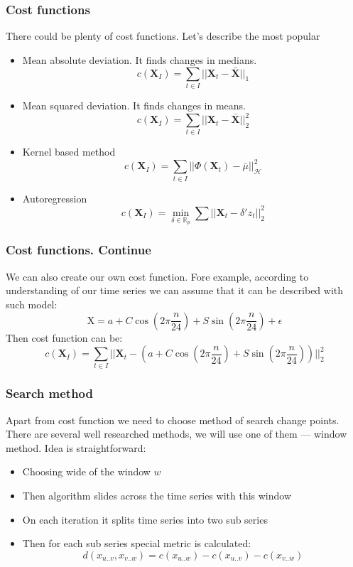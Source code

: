 \documentclass[intlimits, 9pt, unicode]{beamer}
\begin{document}
\begin{frame}
    \frametitle{Cost functions}
	
	There could be plenty of cost functions. Let's describe the most popular
	\begin{itemize}
		\item Mean absolute deviation. It finds changes in medians.
		$$ c(\mathbf{X}_I) = \sum_{t \in I}||\mathbf{X}_t - \bar{\mathbf{X}} ||_1 $$
		\item Mean squared deviation. It finds changes in means.
		$$ c(\mathbf{X}_I) = \sum_{t \in I}||\mathbf{X}_t - \bar{\mathbf{X}} ||_2^2 $$
		\item Kernel based method
		$$ c(\mathbf{X}_I) = \sum_{t\in I} ||\Phi (\mathbf{X}_t) - \bar{\mu} ||_{\mathcal{H}}^2 $$
		\item Autoregression
		$$ c(\mathbf{X}_I) = \min_{\delta \in \mathbb{R}_p}\sum||\mathbf{X}_t - \delta'z_t||_2^2 $$
	\end{itemize}


\end{frame}


\begin{frame}
    \frametitle{Cost functions. Continue}
	
	We can also create our own cost function.
	Fore example, according to understanding of our time series we can assume that it can be described with such model:
	$$ \mathrm{X} = a + C\cos(2\pi \frac{n}{24}) + S \sin(2\pi \frac{n}{24}) + \epsilon $$
	Then cost function can be:
	$$ c(\mathbf{X}_I) = \sum_{t \in I}||\mathbf{X}_t - (a + C\cos(2\pi \frac{n}{24}) + S \sin(2\pi \frac{n}{24})) ||_2^2 $$
\end{frame}

\begin{frame}
    \frametitle{Search method}
	
	Apart from cost function we need to choose method of search change points.
	There are several well researched methods, we will use one of them --- window method.
	Idea is straightforward: 
	\begin{itemize}
		\item Choosing wide of the window $w$
		\item Then algorithm slides across the time series with this window
		\item On each iteration it splits time series into two sub series
		\item Then for each sub series special metric is calculated:
		$$ d(x_{u..v},x_{v..w}) = c(x_{u..w}) - c(x_{u..v}) - c(x_{v..w}) $$
	\end{itemize}
	
\end{frame}
\end{document}
